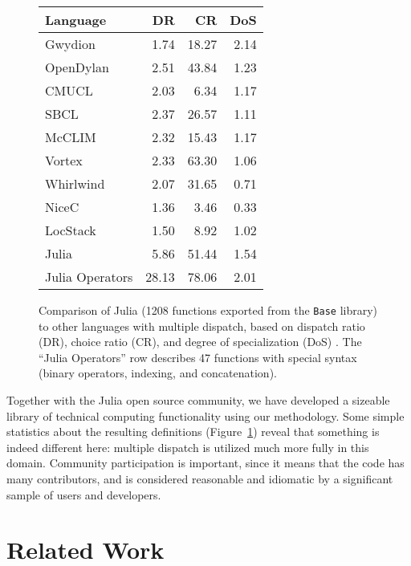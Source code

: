 \documentclass[12pt]{article}
\begin{document}
\begin{figure}
\label{dispatchratios}
\begin{center}
\begin{tabular}{|l|r|r|r|}\hline
\textbf{Language} & \textbf{DR} & \textbf{CR} & \textbf{DoS} \\
\hline \hline
Gwydion    & 1.74 & 18.27 & 2.14 \\
\hline
OpenDylan  & 2.51 & 43.84 & 1.23 \\
\hline
CMUCL      & 2.03 &  6.34 & 1.17 \\
\hline
SBCL       & 2.37 & 26.57 & 1.11 \\
\hline
McCLIM     & 2.32 & 15.43 & 1.17 \\
\hline
Vortex     & 2.33 & 63.30 & 1.06 \\
\hline
Whirlwind  & 2.07 & 31.65 & 0.71 \\
\hline
NiceC      & 1.36 &  3.46 & 0.33 \\
\hline
LocStack   & 1.50 &  8.92 & 1.02 \\
\hline
Julia      & 5.86 & 51.44 & 1.54 \\
\hline
Julia Operators & 28.13 & 78.06 & 2.01 \\
\hline
\end{tabular}
\end{center}
\caption{
Comparison of Julia (1208 functions exported from the \texttt{Base} library)
to other languages with multiple dispatch, based on dispatch ratio (DR),
choice ratio (CR), and degree of specialization (DoS) \cite{multipledispatch}.
The ``Julia Operators'' row describes 47 functions with special syntax
(binary operators, indexing, and concatenation).
}
\end{figure}

Together with the Julia open source community, we have developed a sizeable
library of technical computing functionality using our methodology. Some
simple statistics about the resulting definitions (Figure~\ref{dispatchratios})
reveal that something is indeed different here: multiple dispatch is
utilized much more fully in this domain. Community participation is
important, since it means that the code has many contributors, and
is considered reasonable and idiomatic by a significant sample of users
and developers.



\section{Related Work}
\end{document}
